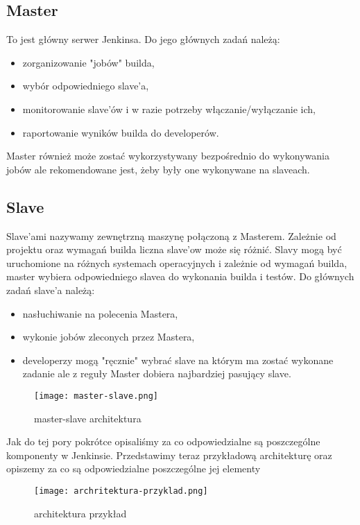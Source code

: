\subsection{Master}

To jest główny serwer Jenkinsa. Do jego głównych zadań należą:
\begin{itemize}
    \item zorganizowanie "jobów" builda,
    \item wybór odpowiedniego slave'a,
    \item monitorowanie slave'ów i w razie potrzeby włączanie/wyłączanie ich,
    \item raportowanie wyników builda do developerów.
\end{itemize}

Master również może zostać wykorzystywany bezpośrednio do wykonywania jobów ale rekomendowane jest, żeby były one wykonywane na slaveach.

\subsection{Slave}

Slave'ami nazywamy zewnętrzną maszynę połączoną z Masterem. Zależnie od projektu oraz wymagań builda liczna slave'ow może się różnić. Slavy mogą być uruchomione na różnych systemach operacyjnych i zależnie od wymagań builda, master wybiera odpowiedniego slavea do wykonania builda i testów. 
Do głównych zadań slave'a należą:
\begin{itemize}
    \item nasłuchiwanie na polecenia Mastera,
    \item wykonie jobów zleconych przez Mastera,
    \item developerzy mogą "ręcznie" wybrać slave na którym ma zostać wykonane zadanie ale z reguły Master dobiera najbardziej pasujący slave.
\end{itemize}

\begin{figure}[htbp]
    \centering
    \texttt{[image: master-slave.png]}
    \caption{master-slave architektura}
    \label{fig:master-slave}
\end{figure}

Jak do tej pory pokrótce opisaliśmy za co odpowiedzialne są poszczególne komponenty w Jenkinsie. Przedstawimy teraz przykładową architekturę oraz opiszemy za co są odpowiedzialne poszczególne jej elementy 

\begin{figure}[htbp]
    \centering
    \texttt{[image: archritektura-przyklad.png]}
    \caption{architektura przykład}
    \label{fig:jenkins-architektura}
\end{figure}

